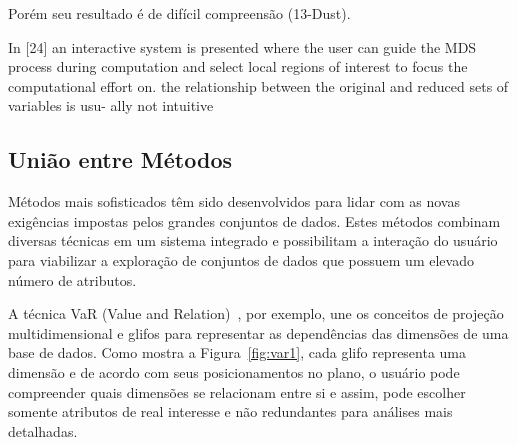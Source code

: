Porém seu resultado é de difícil compreensão (13-Dust). 


In [24] an interactive system is presented where the user can guide the MDS process during computation and select local regions of interest to focus the computational effort on.
the relationship between the original and reduced sets of variables is usu- ally not intuitive


\subsection{União entre Métodos}

Métodos mais sofisticados têm sido desenvolvidos para lidar com as novas exigências impostas pelos grandes conjuntos de dados. Estes métodos combinam diversas técnicas em um sistema integrado e possibilitam a interação do usuário para viabilizar a exploração de conjuntos de dados que possuem um elevado número de atributos.


A técnica VaR (Value and Relation)~\cite{Patro}, por exemplo, une os conceitos de projeção multidimensional e glifos para representar as dependências das dimensões de uma base de dados. Como mostra a Figura~\ref{fig:var1}, cada glifo representa uma dimensão e de acordo com seus posicionamentos no plano, o usuário pode compreender quais dimensões se relacionam entre si e assim, pode escolher somente atributos de real interesse e não redundantes para análises mais detalhadas.

